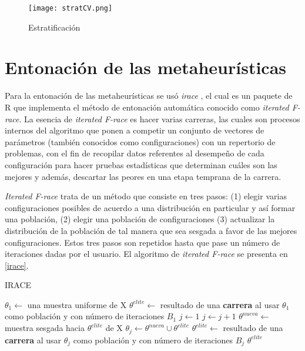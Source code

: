 \begin{figure}[h!]
\centering
\texttt{[image: stratCV.png]}
\caption[Estratificación]{Estratificación}
\label{strat}
\end{figure}

\section{Entonación de las metaheurísticas}

Para la entonación de las metaheurísticas se usó \emph{irace} \cite{lopez2016irace}, el cual es un paquete de R que implementa el método de entonación automática conocido como \emph{iterated F-race}. La esencia de \emph{iterated F-race}
es hacer varias carreras, las cuales son procesos internos del algoritmo que ponen a competir un conjunto de vectores de parámetros (también conocidos como configuraciones) con un repertorio de problemas, con el fin de recopilar datos referentes al desempeño de cada configuración para hacer pruebas estadísticas que determinan cuáles son las mejores y además, descartar las peores en una etapa temprana de la carrera. 

\emph{Iterated F-race} trata de un método que consiste en tres pasos: (1) elegir varias configuraciones posibles de acuerdo a una distribución en particular y así formar una población, (2) elegir una población de configuraciones (3) actualizar la distribución de la población de tal manera que sea sesgada a favor de las mejores configuraciones. Estos tres pasos son repetidos hasta que pase un número de iteraciones dadas por el usuario. El algoritmo de \emph{iterated F-race} se presenta en \ref{irace}.

\begin{algorithm}
\caption{IRACE}
\label{irace}
\begin{algorithmic}[1]


\State $\theta_1 \gets$ una muestra uniforme de X
\State $\theta^{elite} \gets$ resultado de una \textbf{carrera} al usar $\theta_1$ como población y con número de iteraciones $B_1$
\State $j \gets 1$
	\State $j \gets j + 1$
	\State $\theta^{nueva} \gets$ muestra sesgada hacia $\theta^{elite}$ de X 
	\State $\theta_j \gets \theta^{nueva} \cup \theta^{elite}$
	\State $\theta^{elite} \gets$ resultado de una \textbf{carrera} al usar $\theta_j$ como población y con número de iteraciones $B_j$
\EndWhile
\State \Return $\theta^{elite}$

\end{algorithmic}
\end{algorithm}


